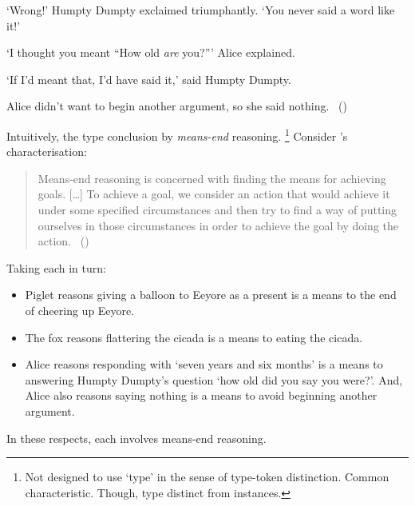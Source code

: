 \begin{note}
\begin{scenario}
    \noindent%
    `Wrong!'
    Humpty Dumpty exclaimed triumphantly.
    `You never said a word like it!'

    \noindent%
    `I thought you meant ``How old \emph{are} you?'''
    Alice explained.

    \noindent%
    `If I'd meant that, I'd have said it,'
    said Humpty Dumpty.

    \noindent%
    Alice didn't want to begin another argument, so she said nothing.\newline
    \mbox{ }\hfill\mbox{(\cite[188]{Carroll:2009aa})}\newline
    \mbox{ }
  \end{scenario}
\end{note}

\begin{note}
  Intuitively, the type conclusion by \emph{means-end} reasoning.%
  \footnote{
    Not designed to use `type' in the sense of type-token distinction.
    Common characteristic.
    Though, type distinct from instances.
  }
  Consider \citeauthor{Pollock:2002aa}'s characterisation:

  \begin{quote}
    Means-end reasoning is concerned with finding the means for achieving goals.
    [\dots]
    To achieve a goal, we consider an action that would achieve it under some specified circumstances and then try to find a way of putting ourselves in those circumstances in order to achieve the goal by doing the action.%
    \mbox{ }\hfill\mbox{(\citeyear[60]{Pollock:2002aa})}
  \end{quote}

  \noindent%
  Taking each  in turn:
  \begin{itemize}
  \item
    Piglet reasons giving a balloon to Eeyore as a present is a means to the end of cheering up Eeyore.
  \item
    The fox reasons flattering the cicada is a means to eating the cicada.
  \item
    Alice reasons responding with `seven years and six months' is a means to answering Humpty Dumpty's question `how old did you say you were?'.
    And, Alice also reasons saying nothing is a means to avoid beginning another argument.
  \end{itemize}

  \noindent%
  In these respects, each  involves means-end reasoning.
\end{note}

